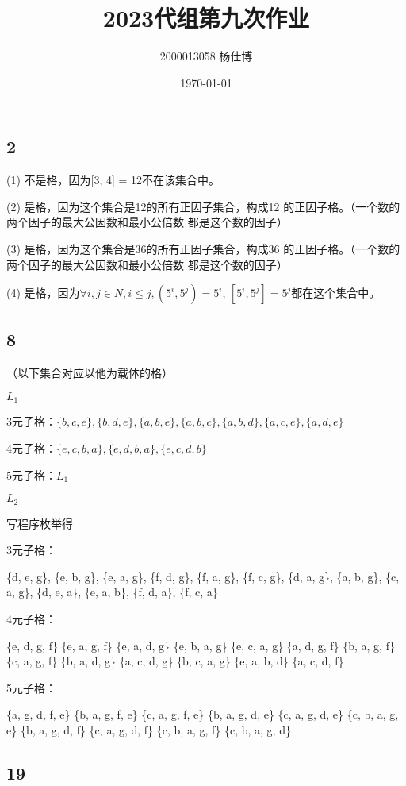 \documentclass[UTF8]{ctexart}
\title{\vspace{-4cm}2023代组第九次作业}
\author{2000013058 杨仕博}
\date{\today}
\begin{document}
\maketitle

\subsection*{2}

(1) 不是格，因为[3, 4] = 12不在该集合中。

(2) 是格，因为这个集合是12的所有正因子集合，构成12
的正因子格。（一个数的两个因子的最大公因数和最小公倍数
都是这个数的因子）

(3) 是格，因为这个集合是36的所有正因子集合，构成36
的正因子格。（一个数的两个因子的最大公因数和最小公倍数
都是这个数的因子）

(4) 是格，因为$\forall i, j\in N, i\leq j, (5^i, 5^j) = 5^i$,
$[5^i, 5^j] = 5^j$都在这个集合中。

\subsection*{8}

（以下集合对应以他为载体的格）

$L_1$

3元子格：$\{b, c, e\}, \{b, d, e\}, \{a, b, e\}, \{a, b, c\}, \{a, b, d\}, \{a, c, e\}, \{a, d, e\}$

4元子格：$\{e, c, b, a\}, \{e, d, b, a\}, \{e, c, d, b\}$

5元子格：$L_1$

$L_2$

写程序枚举得

3元子格：

\{d, e, g\}, 
\{e, b, g\}, 
\{e, a, g\}, 
\{f, d, g\}, 
\{f, a, g\}, 
\{f, c, g\}, 
\{d, a, g\}, 
\{a, b, g\}, 
\{c, a, g\}, 
\{d, e, a\}, 
\{e, a, b\}, 
\{f, d, a\}, 
\{f, c, a\}

4元子格：

\{e, d, g, f\}
\{e, a, g, f\}
\{e, a, d, g\}
\{e, b, a, g\}
\{e, c, a, g\}
\{a, d, g, f\}
\{b, a, g, f\}
\{c, a, g, f\}
\{b, a, d, g\}
\{a, c, d, g\}
\{b, c, a, g\}
\{e, a, b, d\}
\{a, c, d, f\}

5元子格：

\{a, g, d, f, e\}
\{b, a, g, f, e\}
\{c, a, g, f, e\}
\{b, a, g, d, e\}
\{c, a, g, d, e\}
\{c, b, a, g, e\}
\{b, a, g, d, f\}
\{c, a, g, d, f\}
\{c, b, a, g, f\}
\{c, b, a, g, d\}

\subsection*{19}
\end{document}
